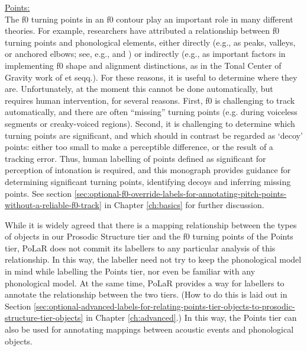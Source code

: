 \documentclass[11pt, twoside]{memoir}
\begin{document}
\uline{Points:}\\ The f0 turning points in an f0 contour play an important role in many different theories.  For example, researchers have attributed a relationship between f0 turning points and phonological elements, either directly (e.g., as peaks, valleys, or anchored elbows; see, e.g., \citealt{ladd-99} and \citealt{welby06}) or indirectly (e.g., as important factors in implementing f0 shape and alignment distinctions, as in the Tonal Center of Gravity work of \citealt{barnes-12} et seqq.). For these reasons, it is useful to determine where they are.  Unfortunately, at the moment this cannot be done automatically, but requires human intervention, for several reasons.  First, f0 is challenging to track automatically, and there are often “missing” turning points (e.g. during voiceless segments or creaky-voiced regions).  Second, it is challenging to determine which turning points are significant, and which should in contrast be regarded as ‘decoy’ points: either too small to make a perceptible difference, or the result of a tracking error.  Thus, human labelling of points defined as significant for perception of intonation is required, and this monograph provides guidance for determining significant turning points, identifying decoys and inferring missing points.  See section \ref{sec:optional-f0-override-labels-for-annotating-pitch-points-without-a-reliable-f0-track} in Chapter \ref{ch:basics} for further discussion.

While it is widely agreed that there is a mapping relationship between the types of objects in our Prosodic Structure tier and the f0 turning points of the Points tier, PoLaR does not commit its labellers to any particular analysis of this relationship. In this way, the labeller need not try to keep the phonological model in mind while labelling the Points tier, nor even be familiar with any phonological model. At the same time, PoLaR provides a way for labellers to annotate the relationship between the two tiers. (How to do this is laid out in Section \ref{sec:optional-advanced-labels-for-relating-points-tier-objects-to-prosodic-structure-tier-objects} in Chapter \ref{ch:advanced}.) In this way, the Points tier can also be used for annotating mappings between acoustic events and phonological objects.
\end{document}
